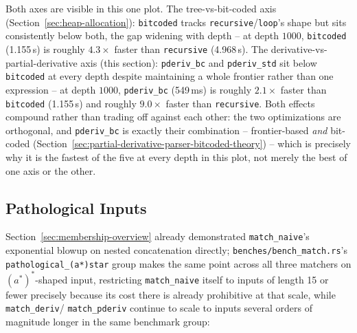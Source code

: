 Both axes are visible in this one plot. The tree-vs-bit-coded axis
(Section~\ref{sec:heap-allocation}): \texttt{bitcoded} tracks
\texttt{recursive}/\texttt{loop}'s shape but sits consistently below both,
the gap widening with depth -- at depth $1000$, \texttt{bitcoded} (1.155\,s)
is roughly $4.3\times$ faster than \texttt{recursive} (4.968\,s). The
derivative-vs-partial-derivative axis (this section): \texttt{pderiv\_bc}
and \texttt{pderiv\_std} sit below \texttt{bitcoded} at every depth despite
maintaining a whole frontier rather than one expression -- at depth
$1000$, \texttt{pderiv\_bc} (549\,ms) is roughly $2.1\times$ faster than
\texttt{bitcoded} (1.155\,s) and roughly $9.0\times$ faster than
\texttt{recursive}. Both effects compound rather than trading off against each other: the
two optimizations are orthogonal, and \texttt{pderiv\_bc} is exactly
their combination -- frontier-based \emph{and} bit-coded
(Section~\ref{sec:partial-derivative-parser-bitcoded-theory}) -- which
is precisely why it is the fastest of the five at every depth in this
plot, not merely the best of one axis or the other.

\subsection{Pathological Inputs}
\label{sec:pathological-inputs}

Section~\ref{sec:membership-overview} already demonstrated
\texttt{match\_naive}'s exponential blowup on nested concatenation
directly; \texttt{benches/bench\_match.rs}'s \texttt{pathological\_(a*)star}
group makes the same point across all three matchers on
$(a^{*})^{*}$-shaped input, restricting \texttt{match\_naive} itself to
inputs of length 15 or fewer precisely because its cost there is
already prohibitive at that scale, while \texttt{match\_deriv}/
\texttt{match\_pderiv} continue to scale to inputs several orders of
magnitude longer in the same benchmark group:

\begin{center}
\end{center}

